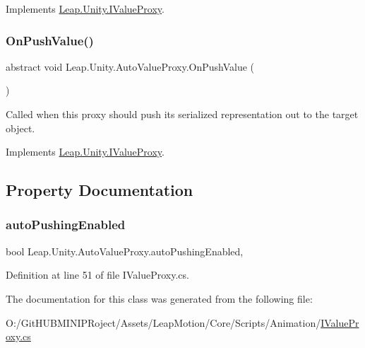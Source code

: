 Implements \mbox{\hyperlink{interface_leap_1_1_unity_1_1_i_value_proxy_a7f9d6fc629e00aa51cca2a3c39c8b097}{Leap.\+Unity.\+I\+Value\+Proxy}}.

\mbox{\label{class_leap_1_1_unity_1_1_auto_value_proxy_a4a538b6c13f9d3a961937652098fc9b3}} 
\subsubsection{\texorpdfstring{OnPushValue()}{OnPushValue()}}
{\footnotesize\ttfamily abstract void Leap.\+Unity.\+Auto\+Value\+Proxy.\+On\+Push\+Value (\begin{DoxyParamCaption}{ }\end{DoxyParamCaption})\hspace{0.3cm}{\ttfamily [pure virtual]}}



Called when this proxy should push its serialized representation out to the target object. 



Implements \mbox{\hyperlink{interface_leap_1_1_unity_1_1_i_value_proxy_ae15d0179600a616ef6bdc8e1a9e2566c}{Leap.\+Unity.\+I\+Value\+Proxy}}.



\subsection{Property Documentation}
\mbox{\label{class_leap_1_1_unity_1_1_auto_value_proxy_aedd186d51ac2dec53cf80435546d7096}} 
\subsubsection{\texorpdfstring{autoPushingEnabled}{autoPushingEnabled}}
{\footnotesize\ttfamily bool Leap.\+Unity.\+Auto\+Value\+Proxy.\+auto\+Pushing\+Enabled\hspace{0.3cm}{\ttfamily [get]}, {\ttfamily [set]}}



Definition at line 51 of file I\+Value\+Proxy.\+cs.



The documentation for this class was generated from the following file\+:\begin{DoxyCompactItemize}
\item 
O\+:/\+Git\+H\+U\+B\+M\+I\+N\+I\+P\+Roject/\+Assets/\+Leap\+Motion/\+Core/\+Scripts/\+Animation/\mbox{\hyperlink{_i_value_proxy_8cs}{I\+Value\+Proxy.\+cs}}\end{DoxyCompactItemize}
